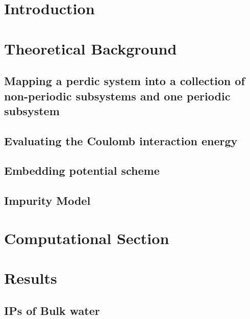 \documentclass[11pt,a4paper]{article}
\begin{document}
\section{Introduction}
\section{Theoretical Background}
\subsection{Mapping a perdic system into a collection of non-periodic subsystems and one periodic subsystem}
\subsection{Evaluating the Coulomb interaction energy}
\subsection{Embedding potential scheme}
\subsection{Impurity Model}
\section{Computational Section}

\section{Results}
\subsection{IPs of Bulk water}
\end{document}
